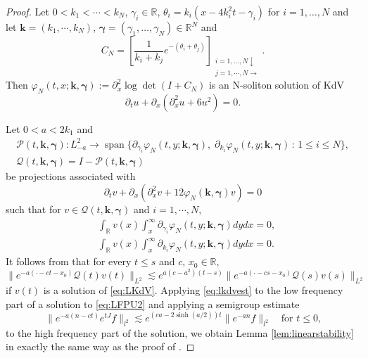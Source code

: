\documentclass[11pt]{amsart}
\theoremstyle{remark}
\numberwithin{equation}{section}
\begin{document}
\begin{proof}
Let $0<k_1<\cdots<k_N$, $\gamma_i\in{\mathbb{R}}$, 
$\theta_i=k_i(x-4k_i^2t-\gamma_i)$ for $i=1,\dots,N$ and let 
${\bm{k}}=(k_1,\cdots,k_N)$, ${\bm{\gamma}}=(\gamma_1,\ldots, \gamma_N)\in{\mathbb{R}}^N$ and
$$C_N=\left[\frac{1}{k_i+k_j}e^{-(\theta_i+\theta_j)}
\right]_{\substack{i=1,\dots,N\downarrow\\ j=1,\cdots,N\rightarrow}}.$$
Then $\varphi_N(t,x;{\bm{k}},{\bm{\gamma}}):={\partial}_x^2\log\det(I+C_N)$ is
an N-soliton solution of KdV
\begin{equation}
  \label{eq:KdV}
  {\partial}_tu+{\partial}_x({\partial}_x^2u+6u^2)=0.
\end{equation}
\par
Let $0<a<2k_1$ and
\begin{gather*}
\mathcal{P}(t,{\bm{k}},{\bm{\gamma}}):L^2_{-a}\to
\operatorname{span}\{{\partial}_{\gamma_i}\varphi_{N}(t,y;{\bm{k}},{\bm{\gamma}}),\;
{\partial}_{k_i}\varphi_{N}(t,y;{\bm{k}},{\bm{\gamma}})\,:\, 1\le i\le N\},
\\  \mathcal{Q}(t,{\bm{k}},{\bm{\gamma}})=I-\mathcal{P}(t,{\bm{k}},{\bm{\gamma}})
\end{gather*}
be projections associated with
\begin{equation}
  \label{eq:LKdV}
{\partial}_tv+{\partial}_x({\partial}_x^2v+12\varphi_N({\bm{k}},{\bm{\gamma}})v)=0
\end{equation}
such that for $v\in\mathcal{Q}(t,{\bm{k}},{\bm{\gamma}})$ and $i=1,\cdots,N$,
\begin{align*}
& \int_{\mathbb{R}} v(x)\int_x^\infty {\partial}_{\gamma_i}\varphi_N(t,y;{\bm{k}},{\bm{\gamma}})dydx=0,\\
& \int_{\mathbb{R}} v(x)\int_x^\infty{\partial}_{k_i}\varphi_N(t,y;{\bm{k}},{\bm{\gamma}})dydx=0.
\end{align*}
It follows from \cite[Section 6]{Mi2} that for every $t\le s$ and $c$,
$x_0\in{\mathbb{R}}$,
\begin{equation}
  \label{eq:lkdvest}
\|e^{-a(\cdot-ct-x_0)}\mathcal{Q}(t)v(t)\|_{L^2}\lesssim
e^{a(c-a^2)(t-s)}\|e^{-a(\cdot-cs-x_0)}\mathcal{Q}(s)v(s)\|_{L^2}  
\end{equation}
if $v(t)$ is a solution of \eqref{eq:LKdV}.
Applying \eqref{eq:lkdvest} to the low frequency part of a solution to
\eqref{eq:LFPU2} and applying a semigroup estimate
$$\|e^{-a(n-ct)}e^{tJ}f\|_{l^2}\lesssim e^{(ca-2\sinh(a/2))t}\|e^{-an}f\|_{l^2}
\quad\text{for $t\le0$,}$$
to the high frequency part of the solution, we obtain
Lemma \ref{lem:linearstability} in exactly the same way as the proof of
\cite[Lemma 5.1]{Mi2}.
\end{proof}
\end{document}
